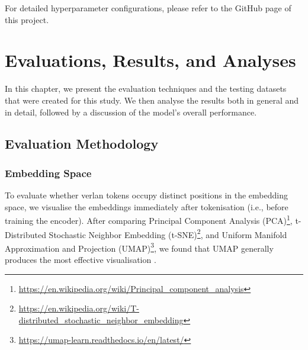 \documentclass[12pt]{article}
\begin{document}
For detailed hyperparameter configurations, please refer to the GitHub page of this project.



\section{Evaluations, Results, and Analyses}

In this chapter, we present the evaluation techniques and the testing datasets that were created for this study. 
We then analyse the results both in general and in detail, followed by a discussion of the model's overall performance.

\subsection{Evaluation Methodology}

\subsubsection{Embedding Space}
To evaluate whether verlan tokens occupy distinct positions in the embedding space, 
we visualise the embeddings immediately after tokenisation (i.e., before training the encoder). 
After comparing Principal Component Analysis (PCA)\footnote{\url{https://en.wikipedia.org/wiki/Principal_component_analysis}}, 
t-Distributed Stochastic Neighbor Embedding (t-SNE)\footnote{\url{https://en.wikipedia.org/wiki/T-distributed_stochastic_neighbor_embedding}}, 
and Uniform Manifold Approximation and Projection (UMAP)\footnote{\url{https://umap-learn.readthedocs.io/en/latest/}}, 
we found that UMAP generally produces the most effective visualisation \cite{pearson1901pca,maaten2008tsne,mcinnes2018umap}.
\end{document}
